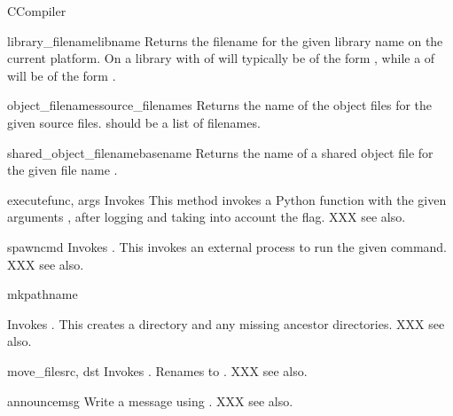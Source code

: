 \documentclass{manual}
\begin{document}
\begin{classdesc}{CCompiler}{}
\begin{methoddesc}{library_filename}{libname}
Returns the filename for the given library name on the current platform.
On \UNIX{} a library with  of  will typically 
be of the form , while a  of  
will be of the form .
\end{methoddesc}

\begin{methoddesc}{object_filenames}{source_filenames}
Returns the name of the object files for the given source files. 
 should be a list of filenames. 
\end{methoddesc}

\begin{methoddesc}{shared_object_filename}{basename}
Returns the name of a shared object file for the given file name .
\end{methoddesc}

\begin{methoddesc}{execute}{func, args}
Invokes  This method invokes a 
Python function  with the given arguments , after 
logging and taking into account the  flag. XXX see also.
\end{methoddesc}

\begin{methoddesc}{spawn}{cmd}
Invokes . This invokes an external 
process to run the given command. XXX see also.
\end{methoddesc}

\begin{methoddesc}{mkpath}{name}

Invokes . This creates a directory 
and any missing ancestor directories. XXX see also.
\end{methoddesc}

\begin{methoddesc}{move_file}{src, dst}
Invokes . Renames  to 
.  XXX see also.
\end{methoddesc}

\begin{methoddesc}{announce}{msg}
Write a message using . XXX see also.
\end{methoddesc}


\end{classdesc}
\end{document}
